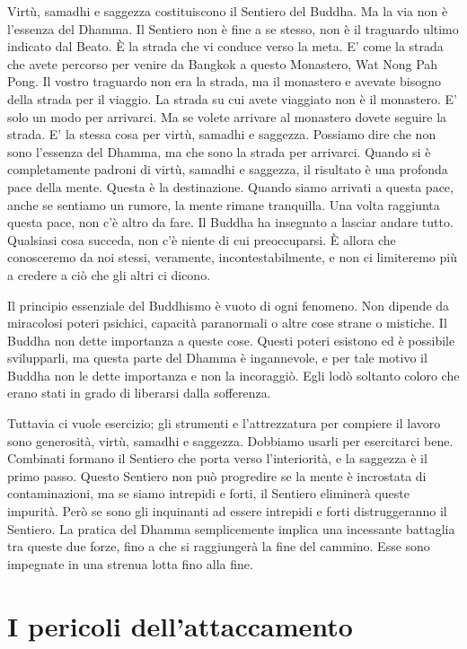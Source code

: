 Virtù, samadhi e saggezza costituiscono il Sentiero del Buddha. Ma la
via non è l'essenza del Dhamma. Il Sentiero non è fine a se stesso, non
è il traguardo ultimo indicato dal Beato. È la strada che vi conduce
verso la meta. E' come la strada che avete percorso per venire da
Bangkok a questo Monastero, Wat Nong Pah Pong. Il vostro traguardo non
era la strada, ma il monastero e avevate bisogno della strada per il
viaggio. La strada su cui avete viaggiato non è il monastero. E' solo un
modo per arrivarci. Ma se volete arrivare al monastero dovete seguire la
strada. E' la stessa cosa per virtù, samadhi e saggezza. Possiamo dire
che non sono l'essenza del Dhamma, ma che sono la strada per arrivarci.
Quando si è completamente padroni di virtù, samadhi e saggezza, il
risultato è una profonda pace della mente. Questa è la destinazione.
Quando siamo arrivati a questa pace, anche se sentiamo un rumore, la
mente rimane tranquilla. Una volta raggiunta questa pace, non c'è altro
da fare. Il Buddha ha insegnato a lasciar andare tutto. Qualsiasi cosa
succeda, non c'è niente di cui preoccuparsi. È allora che conosceremo da
noi stessi, veramente, incontestabilmente, e non ci limiteremo più a
credere a ciò che gli altri ci dicono.

Il principio essenziale del Buddhismo è vuoto di ogni fenomeno. Non
dipende da miracolosi poteri psichici, capacità paranormali o altre cose
strane o mistiche. Il Buddha non dette importanza a queste cose. Questi
poteri esistono ed è possibile svilupparli, ma questa parte del Dhamma è
ingannevole, e per tale motivo il Buddha non le dette importanza e non
la incoraggiò. Egli lodò soltanto coloro che erano stati in grado di
liberarsi dalla sofferenza.

Tuttavia ci vuole esercizio; gli strumenti e l'attrezzatura per compiere
il lavoro sono generosità, virtù, samadhi e saggezza. Dobbiamo usarli
per esercitarci bene. Combinati formano il Sentiero che porta verso
l'interiorità, e la saggezza è il primo passo. Questo Sentiero non può
progredire se la mente è incrostata di contaminazioni, ma se siamo
intrepidi e forti, il Sentiero eliminerà queste impurità. Però se sono
gli inquinanti ad essere intrepidi e forti distruggeranno il Sentiero.
La pratica del Dhamma semplicemente implica una incessante battaglia tra
queste due forze, fino a che si raggiungerà la fine del cammino. Esse
sono impegnate in una strenua lotta fino alla fine.

\section{I pericoli dell'attaccamento}

